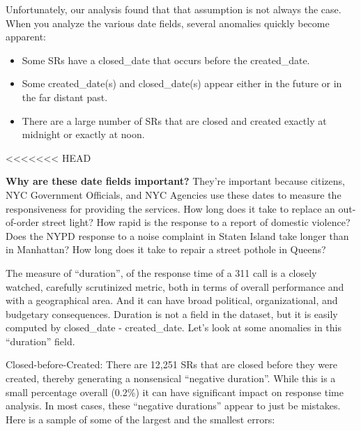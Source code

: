 \documentclass[12pt, titlepage]{article}
\begin{document}
	Unfortunately, our analysis found that that assumption is not always 
	the case. When you analyze the various date fields, several anomalies 
	quickly become apparent:
	
	\begin{itemize}
		\item Some SRs have a closed\_date that occurs before the created\_date.
	 	\item Some created\_date(s) and closed\_date(s) appear either in 
	 	the future or in the far distant past.
		\item There are a large number of SRs that are closed and created 
		exactly at midnight or exactly at noon. 
	\end{itemize}
<<<<<<< HEAD
	
	\textbf{Why are these date fields important?} They're important because 
	citizens, NYC Government Officials, and NYC Agencies use these 
	dates to measure the responsiveness for providing the 
	services. How long does it take to replace an out-of-order 
	street light? How rapid is the response to a report of domestic 
	violence? Does the NYPD response to a noise complaint in 
	Staten Island take longer than in Manhattan? How long does it 
	take to repair a street pothole in Queens? 
	
	The measure of ``duration'', of the response time of a 311 call is a closely 
	watched, carefully scrutinized metric, both in terms of overall performance 
	and with a geographical area. And it can have broad political, organizational, 
	and budgetary consequences. Duration is not a field in the dataset, 
	but it is easily computed by closed\_date - created\_date. Let's look at 
	some anomalies in this ``duration'' field.
	
	Closed-before-Created:  There are 12,251 SRs that are closed before they 
	were created, thereby generating a nonsensical ``negative duration''. 
	While this is a small percentage overall (0.2\%) it can have significant impact 
	on response time analysis. In most cases, these ``negative durations'' 
	appear to just be mistakes. Here is a sample of some of the 
	largest and the smallest errors:
	
\end{document}
